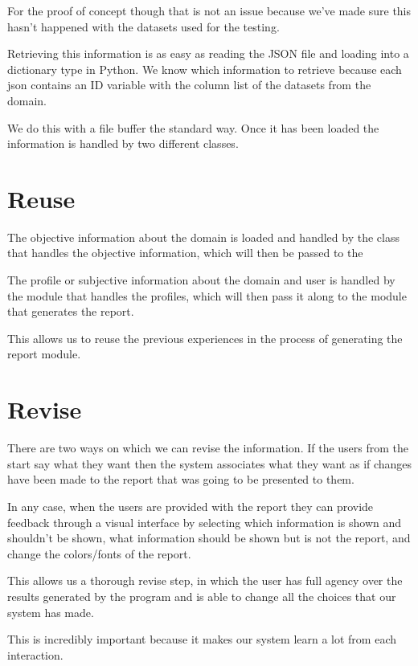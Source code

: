 For the proof of concept though that is not an issue because we've made sure this hasn't happened with the datasets used for the testing.

Retrieving this information is as easy as reading the JSON file and loading into a dictionary type in Python. We know which information to retrieve because each json contains an ID variable with the column list of the datasets from the domain.

We do this with a file buffer the standard way. Once it has been loaded the information is handled by two different classes.

\section{Reuse}
\label{cap6:sec:reuse}
The objective information about the domain is loaded and handled by the class that handles the objective information, which will then be passed to the 

The profile or subjective information about the domain and user is handled by the module that handles the profiles, which will then pass it along to the module that generates the report.

This allows us to reuse the previous experiences in the process of generating the report module.

\section{Revise}
\label{cap6:sec:revise}
There are two ways on which we can revise the information. If the users from the start say what they want then the system associates what they want as if changes have been made to the report that was going to be presented to them.

In any case, when the users are provided with the report they can provide feedback through a visual interface by selecting which information is shown and shouldn't be shown, what information should be shown but is not the report, and change the colors/fonts of the report.

This allows us a thorough revise step, in which the user has full agency over the results generated by the program and is able to change all the choices that our system has made.

This is incredibly important because it makes our system learn a lot from each interaction.


